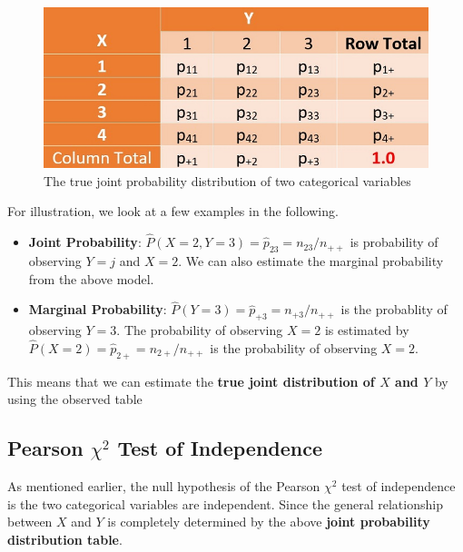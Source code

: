 \documentclass[
]{book}
\begin{document}
\begin{figure}

{\centering \includegraphics[width=0.8\linewidth]{img12/w12-ProbTable} 

}

\caption{The true joint probability distribution of two categorical variables}\label{fig:unnamed-chunk-191}
\end{figure}

For illustration, we look at a few examples in the following.

\begin{itemize}
\item
  \textbf{Joint Probability}: \(\hat{P}(X=2, Y=3) = \hat{p}_{23} = n_{23}/n_{++}\) is probability of observing \(Y=j\) and \(X=2\). We can also estimate the marginal probability from the above model.
\item
  \textbf{Marginal Probability}: \(\hat{P}(Y=3) = \hat{p}_{+3} = n_{+ 3}/n_{++}\) is the probablity of observing \(Y=3\). The probability of observing \(X=2\) is estimated by \(\hat{P}(X=2) = \hat{p}_{2+} = n_{2+}/n_{++}\) is the probability of observing \(X = 2\).
\end{itemize}

This means that we can estimate the \textbf{true joint distribution of \(X\) and \(Y\)} by using the observed table

\hypertarget{pearson-chi2-test-of-independence}{%
\subsection{\texorpdfstring{Pearson \(\chi^2\) Test of Independence}{Pearson \textbackslash chi\^{}2 Test of Independence}}\label{pearson-chi2-test-of-independence}}

As mentioned earlier, the null hypothesis of the Pearson \(\chi^2\) test of independence is the two categorical variables are independent. Since the general relationship between \(X\) and \(Y\) is completely determined by the above \textbf{joint probability distribution table}.
\end{document}
